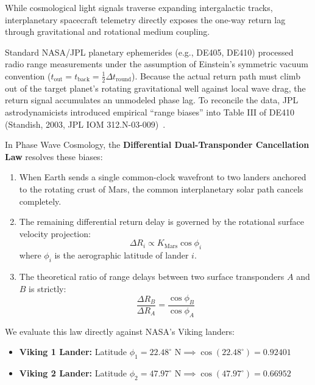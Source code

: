 \documentclass[11pt,a4paper]{article}
\begin{document}
While cosmological light signals traverse expanding intergalactic tracks, interplanetary spacecraft telemetry directly exposes the one-way return lag through gravitational and rotational medium coupling.

Standard NASA/JPL planetary ephemerides (e.g., DE405, DE410) processed radio range measurements under the assumption of Einstein's symmetric vacuum convention ($t_{\text{out}} = t_{\text{back}} = \frac{1}{2}\Delta t_{\text{round}}$). Because the actual return path must climb out of the target planet's rotating gravitational well against local wave drag, the return signal accumulates an unmodeled phase lag. To reconcile the data, JPL astrodynamicists introduced empirical ``range biases'' into Table III of DE410 (Standish, 2003, JPL IOM 312.N-03-009)~\cite{Standish2003}.

In Phase Wave Cosmology, the \textbf{Differential Dual-Transponder Cancellation Law} resolves these biases:
\begin{enumerate}
    \item When Earth sends a single common-clock wavefront to two landers anchored to the rotating crust of Mars, the common interplanetary solar path cancels completely.
    \item The remaining differential return delay is governed by the rotational surface velocity projection:
    \begin{equation}
    \Delta R_i \propto K_{\text{Mars}} \cos\phi_i
    \end{equation}
    where $\phi_i$ is the aerographic latitude of lander $i$.
    \item The theoretical ratio of range delays between two surface transponders $A$ and $B$ is strictly:
    \begin{equation}
    \frac{\Delta R_B}{\Delta R_A} = \frac{\cos\phi_B}{\cos\phi_A}
    \label{eq:viking_latitude_ratio}
    \end{equation}
\end{enumerate}

We evaluate this law directly against NASA's Viking landers:
\begin{itemize}
    \item \textbf{Viking 1 Lander:} Latitude $\phi_1 = 22.48^\circ\text{ N} \implies \cos(22.48^\circ) = 0.92401$
    \item \textbf{Viking 2 Lander:} Latitude $\phi_2 = 47.97^\circ\text{ N} \implies \cos(47.97^\circ) = 0.66952$
\end{itemize}
\end{document}
